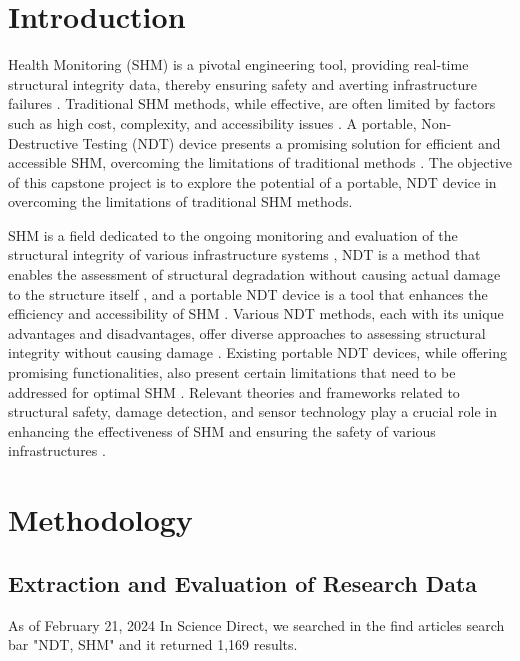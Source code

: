 \documentclass[journal, a4paper]{IEEEtran}
\begin{document}
\section{Introduction}
 Health Monitoring (SHM) is a pivotal engineering tool, providing real-time structural integrity data,
thereby ensuring safety and averting infrastructure failures \cite{Gharehbaghi2022} \cite{Katam2023}.
Traditional SHM methods, while effective, are often limited by factors such as
high cost, complexity, and accessibility issues \cite{Katam2023} \cite{Gharehbaghi2022}.
A portable, Non-Destructive Testing (NDT) device presents a promising solution for efficient and accessible SHM,
overcoming the limitations of traditional methods \cite{Guo2022} \cite{Chen2023}.
The objective of this capstone project is to explore the potential of a portable,
NDT device in overcoming the limitations of traditional SHM methods.

SHM is a field dedicated to the ongoing monitoring and evaluation of the structural integrity
of various infrastructure systems \cite{Katam2023}, NDT is a method that enables the assessment
of structural degradation without causing actual damage to the structure itself \cite{Katam2023},
and a portable NDT device is a tool that enhances the efficiency and accessibility of SHM \cite{Hassani2023} \cite{Katam2023}.
Various NDT methods, each with its unique advantages and disadvantages,
offer diverse approaches to assessing structural integrity without causing damage \cite{Dolati2021} \cite{Verma2013}.
Existing portable NDT devices, while offering promising functionalities,
also present certain limitations that need to be addressed for optimal SHM \cite{Hassani2023} \cite{Zhu2011}.
Relevant theories and frameworks related to structural safety, damage detection,
and sensor technology play a crucial role in enhancing the effectiveness of SHM
and ensuring the safety of various infrastructures \cite{Chen2021} \cite{Gharehbaghi2022}.


\section{Methodology}
\subsection{Extraction and Evaluation of Research Data}

As of February 21, 2024
In Science Direct, we searched in the find articles search bar "NDT, SHM" and it returned 1,169 results.
\end{document}
